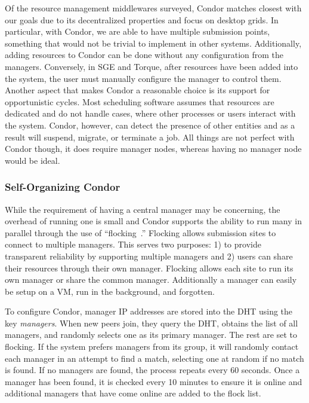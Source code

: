 \documentclass[conference]{IEEEtran}
\begin{document}
\addtocounter{footnote}{1}
\addtocounter{footnote}{1}
\addtocounter{footnote}{1}

Of the resource management middlewares surveyed, Condor matches closest with
our goals due to its decentralized properties and focus on desktop grids.  In
particular, with Condor, we are able to have multiple submission points,
something that would not be trivial to implement in other systems.
Additionally, adding resources to Condor can be done without any configuration
from the managers.  Conversely, in SGE and Torque, after resources have been
added into the system, the user must manually configure the manager to control
them.  Another aspect that makes Condor a reasonable choice is its support for
opportunistic cycles.  Most scheduling software assumes that resources are
dedicated and do not handle cases, where other processes or users interact with
the system.  Condor, however, can detect the presence of other entities and as
a result will suspend, migrate, or terminate a job.  All things are not perfect
with Condor though, it does require manager nodes, whereas having no manager
node would be ideal.

\subsubsection{Self-Organizing Condor}

While the requirement of having a central manager may be concerning, the
overhead of running one is small and Condor supports the ability to run many in
parallel through the use of ``flocking~\cite{flocking}.'' Flocking allows
submission sites to connect to multiple managers.  This serves two purposes: 1)
to provide transparent reliability by supporting multiple managers and 2) users
can share their resources through their own manager.  Flocking allows each site
to run its own manager or share the common manager.  Additionally a manager can
easily be setup on a VM, run in the background, and forgotten.

To configure Condor, manager IP addresses are stored into the DHT using the key
\emph{managers}.  When new peers join, they query the DHT, obtains the list of
all managers, and randomly selects one as its primary manager.  The rest are
set to flocking.  If the system prefers managers from its group, it will
randomly contact each manager in an attempt to find a match, selecting one at
random if no match is found.  If no managers are found, the process repeats
every 60 seconds.  Once a manager has been found, it is checked every 10
minutes to ensure it is online and additional managers that have come online
are added to the flock list.
\end{document}
